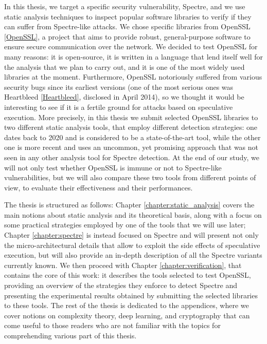\documentclass[12pt,a4paper]{book}
\theoremstyle{definition}
\begin{document}
	\medskip
	In this thesis, we target a specific security vulnerability, Spectre, and we use static analysis techniques to inspect popular software libraries to verify if they can suffer from Spectre-like attacks. We chose specific libraries from OpenSSL \ref{OpenSSL}, a project that aims to provide robust, general-purpose software to ensure secure communication over the network. We decided to test OpenSSL for many reasons: it is open-source, it is written in a language that lend itself well for the analysis that we plan to carry out, and it is one of the most widely used libraries at the moment. Furthermore, OpenSSL notoriously suffered from various security bugs since its earliest versions (one of the most serious ones was Heartbleed \ref{Heartbleed}, disclosed in April 2014), so we thought it would be interesting to see if it is a fertile ground for attacks based on speculative execution. More precisely, in this thesis we submit selected OpenSSL libraries to two different static analysis tools, that employ different detection strategies: one dates back to 2020 and is considered to be a state-of-the-art tool, while the other one is more recent and uses an uncommon, yet promising approach that was not seen in any other analysis tool for Spectre detection. At the end of our study, we will not only test whether OpenSSL is immune or not to Spectre-like vulnerabilities, but we will also compare these two tools from different points of view, to evaluate their effectiveness and their performances.
	
	The thesis is structured as follows: Chapter \ref{chapter:static_analysis} covers the main notions about static analysis and its theoretical basis, along with a focus on some practical strategies employed by one of the tools that we will use later; Chapter \ref{chapter:spectre} is instead focused on Spectre and will present not only the micro-architectural details that allow to exploit the side effects of speculative execution, but will also provide an in-depth description of all the Spectre variants currently known. We then proceed with Chapter \ref{chapter:verification}, that contains the core of this work: it describes the tools selected to test OpenSSL, providing an overview of the strategies they enforce to detect Spectre and presenting the experimental results obtained by submitting the selected libraries to these tools. The rest of the thesis is dedicated to the appendices, where we cover notions on complexity theory, deep learning, and cryptography that can come useful to those readers who are not familiar with the topics for comprehending various part of this thesis.
	
\end{document}
